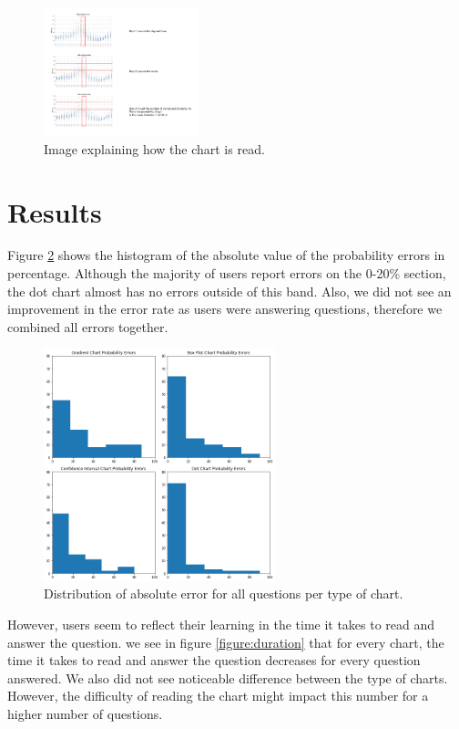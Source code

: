 \documentclass[a4paper,3p,sort&compress]{elsarticle}
\begin{document}
\begin{figure}
  \centering
  \includegraphics[width=0.4\textwidth]{dot_explanation}
  \caption{\label{figure:explanation} Image explaining how the chart is read.  }
\end{figure}

\section{Results}
\label{sec:results}

Figure \ref{figure:errors} shows the histogram of the absolute value of the probability errors in percentage. 
Although the majority 
of users report errors on the 0-20\% section, the dot chart almost has no errors outside of this band. 
Also, we did not see an improvement in 
the error rate as users were answering questions, therefore we combined all errors together.

\begin{figure}
  \centering
  \includegraphics[width=0.6\textwidth]{probability_errors}
  \caption{\label{figure:errors}Distribution of absolute error for all questions per type of chart.}
\end{figure}

However, users seem to reflect their learning in the time it takes to read 
and answer the question. we see in figure \ref{figure:duration} that for every chart, the time it takes 
to read and answer the question decreases for every question answered. We also did not see 
noticeable difference between the type of charts. However, the difficulty of reading the chart might impact 
this number for a higher number of questions.
\end{document}
